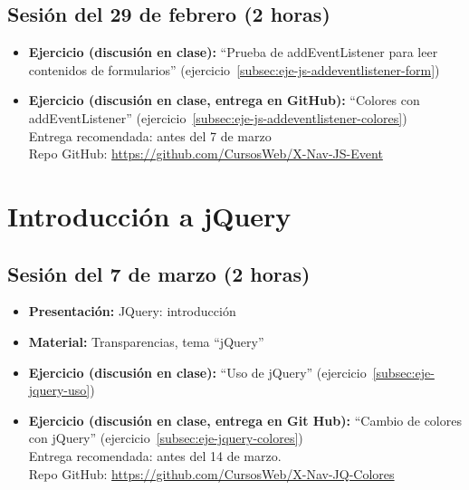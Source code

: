 \documentclass[a4paper,12pt]{report}
\begin{document}
\subsection{Sesión del 29 de febrero (2 horas)}

\begin{itemize}
\item \textbf{Ejercicio (discusión en clase):} ``Prueba de addEventListener para leer contenidos de formularios'' (ejercicio~\ref{subsec:eje-js-addeventlistener-form})
\item \textbf{Ejercicio (discusión en clase, entrega en GitHub):} ``Colores con addEventListener'' (ejercicio~\ref{subsec:eje-js-addeventlistener-colores}) \\
  Entrega recomendada: antes del 7 de marzo \\
  Repo GitHub: \url{https://github.com/CursosWeb/X-Nav-JS-Event} \\
\end{itemize}


\section{Introducción a jQuery}


\subsection{Sesión del 7 de marzo (2 horas)}

\begin{itemize}
\item \textbf{Presentación:} JQuery: introducción
\item \textbf{Material:} Transparencias, tema ``jQuery''
\item \textbf{Ejercicio (discusión en clase):} ``Uso de jQuery'' (ejercicio~\ref{subsec:eje-jquery-uso})
\item \textbf{Ejercicio (discusión en clase, entrega en Git Hub):} ``Cambio de colores con jQuery'' (ejercicio~\ref{subsec:eje-jquery-colores}) \\
  Entrega recomendada: antes del 14 de marzo.  \\
  Repo GitHub: \url{https://github.com/CursosWeb/X-Nav-JQ-Colores} \\
\end{itemize}
\end{document}
